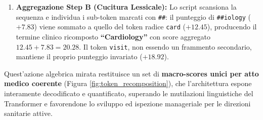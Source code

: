 \begin{enumerate}
    \item \textbf{Aggregazione Step B (Cucitura Lessicale):} Lo script scansiona la sequenza e individua i sub-token marcati con \texttt{\#\#}: il punteggio di \texttt{\#\#iology} ($+7.83$) viene sommato a quello del token radice \texttt{card} ($+12.45$), producendo il termine clinico ricomposto \textbf{``Cardiology''} con score aggregato $12.45 + 7.83 = 20.28$. Il token \texttt{visit}, non essendo un frammento secondario, mantiene il proprio punteggio invariato ($+18.92$).
\end{enumerate}

Quest'azione algebrica mirata restituisce un set di \textbf{macro-scores unici per atto medico coerente} (Figura \ref{fig:token_recomposition}), che l'architettura espone interamente decodificato e quantificato, superando le mutilazioni linguistiche del Transformer e favorendone lo sviluppo ed ispezione manageriale per le direzioni sanitarie attive.

